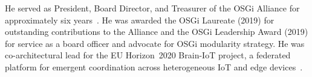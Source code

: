 \documentclass[11pt]{article}
\begin{document}
He served as President, Board Director, and Treasurer of the OSGi Alliance for
approximately six years~\cite{osgi-mod,osgi-cmb}. He was awarded the OSGi Laureate
(2019) for outstanding contributions to the Alliance and the OSGi Leadership Award
(2019) for service as a board officer and advocate for OSGi modularity strategy.
He was co-architectural lead for the EU Horizon~2020 Brain-IoT project, a
federated platform for emergent coordination across heterogeneous IoT and edge
devices~\cite{brain-iot-1,brain-iot-2}.
\end{document}
